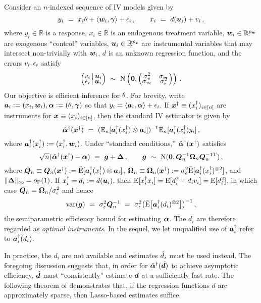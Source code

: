 \documentclass{uwstat572}
\newcommand{\be}{\begin{equation}}
\newcommand{\ee}{\end{equation}}
\newcommand{\benn}{\begin{equation*}}
\newcommand{\eenn}{\end{equation*}}
\theoremstyle{definition}
\theoremstyle{remark}
\newcommand{\R}{\ensuremath{\mathbb{R}}}
\newcommand{\Prb}{\mathrm{P}}
\newcommand{\E}{\mathrm{E}}
\newcommand{\En}{\bar{\E}}
\newcommand{\Ex}{\mathbb{E}}
\newcommand{\Exn}{\Ex_n}
\newcommand{\var}{\mathrm{var}}
\newcommand{\Normal}{\mathrm{N}}
\newcommand{\bs}[1]{\boldsymbol{#1}}
\numberwithin{equation}{section}
\begin{document}
Consider an $n$-indexed sequence of IV models given by
\be\label{mod:iv}
	y_i \ = \ x_i\regt + \langle\w_i, \regg\rangle + \ersi\,, \qquad x_i \ = \ d(\u_i) + \erfi \,,
\ee
where $y_i \in \R$ is a response, $x_i \in \R$ is an endogenous treatment variable, $\w_i\in\R^{\pw}$ are exogenous ``control'' variables, $\u_i \in \R^{\pz}$ are instrumental variables that may intersect non-trivially with $\w_i$, $d$ is an unknown regression function, and the errors $v_i, \epsilon_i$ satisfy
\benn
	\begin{pmatrix} \erfi \,|\, \u_i \\[-.5em] \ersi \,|\, \u_i \end{pmatrix} \ \sim \ \Normal\left(\bs{0}, \begin{pmatrix} \sdf^2 & \sdfs \\[-.5em] \sdfs & \sds^2 \end{pmatrix} \right)\,.
\eenn
Our objective is efficient inference for $\theta$. For brevity, write $\a_i := (x_i, \w_i), \rega := (\regt, \regg)$ so that $y_i = \langle \a_i, \rega \rangle + \ersi$. If $\xinst \equiv (\xinsti)_{i\inn}$ are instruments for $\x \equiv (x_i)_{i\inn}$, then the standard IV estimator is given by
\be\label{def:regaiv}
	\regaiv(\xinst) \ = \ (\Exn[\ainsti(\xinsti) \kp \a_i])^{-1}\Exn[\ainsti(\xinsti) y_i] \,,
\ee
where $\ainst_i(\xinsti) := (\xinsti, \w_i)$. Under ``standard conditions,'' $\regaiv(\xinst)$ satisfies
\benn
	\sqrt{n}(\regaiv(\xinst) - \rega) \ = \ \g + \rm\,, \qquad \g \ \sim \ \Normal(\bs{0}, \Qn^{-1}\Omn\Qn^{-1\tp})\,,
\eenn
where $\Qn \equiv \Qn(\xinst) := \En[\ainst_i(\xinsti) \kp \a_i]$, $\Omn \equiv \Omn(\xinst) := \sds^2\En[\ainsti(\xinsti)^{\kpt}]$, and $\|\rm\|_\infty = o_{\Prb}(1)$. If $\xinsti = d_i := d(\u_i)$, then $\E[\xinsti x_i] = \E[d_i^2 + d_i\erfi] = \E[d_i^2]$, in which case $\Qn = \Omn/\sds^2$ and hence
\benn
	\var(\g) \ = \ \sds^2\Qn^{-1} \ = \ \sds^2\big(\En\big[\ainsti(d_i)^{\kpt}\big]\big)^{-1} \,,
\eenn
the semiparametric efficiency bound for estimating $\rega$.  The $d_i$ are therefore regarded as \emph{optimal instruments}. In the sequel, we let unqualified use of $\ainsti$ refer to $\ainsti(d_i)$. 

In practice, the $d_i$ are not available and estimates $\hat{d}_i$ must be used instead. The foregoing discussion suggests that, in order for $\regaiv(\dhat)$ to achieve asymptotic efficiency, $\dhat$ must ``consistently'' estimate $\d$ at a sufficiently fast rate. The following theorem of \cite{BCH11} demonstrates that, if the regression functions $d$ are approximately sparse, then Lasso-based estimates suffice.
\end{document}
